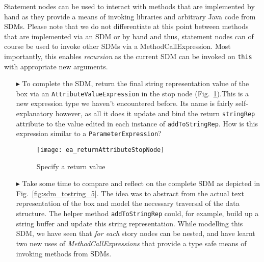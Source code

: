 Statement nodes can be used to interact with methods that are implemented by hand as they provide a means of invoking libraries and arbitrary Java code from
SDMs. Please note that we do not differentiate at this point between methods that are implemented via an SDM or by hand and thus, statement nodes can of course
be used to invoke other SDMs via a MethodCallExpression. Most importantly, this enables \emph{recursion} as the current SDM can be invoked on \texttt{this} with
appropriate new arguments.

\newpage

\begin{itemize}

\item[$\blacktriangleright$] To complete the SDM, return the final string representation value of the box via an \texttt{AttributeValueExpression} in
the stop node (Fig.~\ref{fig:toStringStopNode}).This is a new expression type we haven't encountered before. Its name is
fairly self-explanatory however, as all it does it update and bind the return \texttt{stringRep} attribute to the value edited in each instance of
\texttt{addToStringRep}. How is this expression similar to a \texttt{Parameter\-Expression}?

\vspace{0.5cm}

\begin{figure}[htbp]
\begin{center}
  \texttt{[image: ea\_returnAttributeStopNode]}
  \caption{Specify a return value}
  \label{fig:toStringStopNode}
\end{center}
\end{figure}

\vspace{0.5cm}

\item[$\blacktriangleright$] Take some time to compare and reflect on the complete SDM as depicted in Fig.~\ref{fig:sdm_tostring_5}.  The idea was to abstract
from the actual text representation of the box and model the necessary traversal of the data structure. The helper method \texttt{addToStringRep} could, for
example, build up a string buffer and update this string representation. While modelling this SDM, we have seen that \emph{for each} story nodes can be nested,
and have learnt two new uses of \emph{MethodCallExpressions} that provide a type safe means of invoking methods from SDMs.

\vspace{0.5cm}


\end{itemize}
